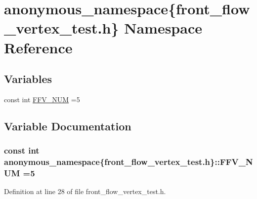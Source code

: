 \hypertarget{namespaceanonymous__namespace_02front__flow__vertex__test_8h_03}{}\section{anonymous\+\_\+namespace\{front\+\_\+flow\+\_\+vertex\+\_\+test.\+h\} Namespace Reference}
\label{namespaceanonymous__namespace_02front__flow__vertex__test_8h_03}
\subsection*{Variables}
\begin{DoxyCompactItemize}
\item 
const int \hyperlink{namespaceanonymous__namespace_02front__flow__vertex__test_8h_03_a376671144fcb4496d4ad27b14998ed8a}{F\+F\+V\+\_\+\+N\+U\+M} =5
\end{DoxyCompactItemize}


\subsection{Variable Documentation}
\hypertarget{namespaceanonymous__namespace_02front__flow__vertex__test_8h_03_a376671144fcb4496d4ad27b14998ed8a}{}
\subsubsection[{F\+F\+V\+\_\+\+N\+U\+M}]{\setlength{\rightskip}{0pt plus 5cm}const int anonymous\+\_\+namespace\{front\+\_\+flow\+\_\+vertex\+\_\+test.\+h\}\+::F\+F\+V\+\_\+\+N\+U\+M =5}\label{namespaceanonymous__namespace_02front__flow__vertex__test_8h_03_a376671144fcb4496d4ad27b14998ed8a}


Definition at line 28 of file front\+\_\+flow\+\_\+vertex\+\_\+test.\+h.

